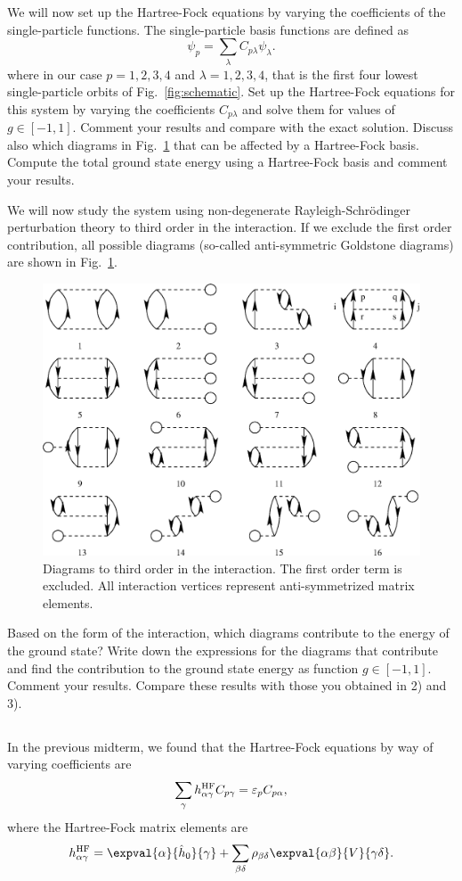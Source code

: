 We will now set up the Hartree-Fock equations by varying the coefficients of the single-particle functions.
The single-particle basis functions are defined as
\[
    \psi_p = \sum_{\lambda} C_{p\lambda} \psi_{\lambda}.
\]
where in our case $p=1,2,3,4$ and $\lambda = 1, 2, 3, 4$, that is the first four lowest single-particle orbits of Fig.~\ref{fig:schematic}.
Set up the Hartree-Fock equations for this system by varying the coefficients $C_{p\lambda}$ and solve them for values of $g \in [-1, 1]$.
Comment your results and compare with the exact solution.
Discuss also which diagrams in Fig.~\ref{fig:diagrams} that can be affected by a Hartree-Fock basis.
Compute the total ground state energy  using a Hartree-Fock basis and comment your results.

We will now study the system using non-degenerate Rayleigh-Schr\"odinger perturbation theory to third order in the interaction.
If we exclude the first order contribution, all possible diagrams (so-called anti-symmetric Goldstone diagrams) are shown in Fig.~\ref{fig:diagrams}.
\begin{figure}[hbtp]
    \centering
    \includegraphics[width=.6\textwidth]{figures/diagrams.eps}
    \caption{
        Diagrams to third order in the interaction.
        The first order
        term is excluded.
        All interaction vertices represent anti-symmetrized matrix elements.\label{fig:diagrams}
    }
\end{figure}

Based on the form of the interaction, which diagrams contribute to the energy of the ground state?  Write down the expressions for the diagrams that contribute and find the contribution to the ground state energy as function $g\in [-1,1]$.
Comment your results.
Compare these results with those you obtained in 2) and 3). %

\subsection{}
In the previous midterm, we found that the Hartree-Fock equations by way of varying coefficients are
\begin{equation*}
    \sum_{\gamma} h_{\alpha\gamma}^{\mathrm{HF}} C_{p\gamma} = \varepsilon_p C_{p\alpha},
\end{equation*}
where the Hartree-Fock matrix elements are
\begin{equation*}
    h_{\alpha \gamma}^\HF = \expval{\alpha}{\hat{h}_0}{\gamma} + \sum_{\beta\delta} \rho_{\beta\delta} \expval{\alpha\beta}{V}{\gamma\delta}.
\end{equation*}

